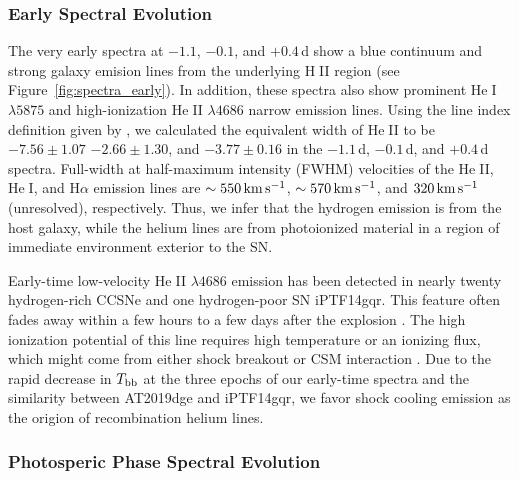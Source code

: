 \documentclass[twocolumn]{aastex63}
\def\ion#1#2{#1$\;${\footnotesize\rm{#2}}\relax}
\begin{document}
\begin{CJK*}{UTF8}{gbsn}
\subsubsection{Early Spectral Evolution} \label{subsubsec:spec_early}
The very early spectra at $-1.1$, $-0.1$, and $+0.4$\,d show a blue continuum and strong galaxy 
emision lines from the underlying \ion{H}{II} region (see Figure~\ref{fig:spectra_early}). In 
addition, these spectra also show prominent \ion{He}{I} $\lambda5875$ and high-ionization \ion{He}{II} 
$\lambda4686$ narrow emission lines. Using the line index definition given by \citet{Khazov2016}, we 
calculated the equivalent width of \ion{He}{II} to be $-7.56\pm 1.07$ 
$-2.66\pm 1.30$, and $-3.77\pm 0.16$ in the $-1.1$\,d, $-0.1$\,d, and $+0.4$\,d spectra. Full-width at 
half-maximum intensity (FWHM) velocities of the \ion{He}{II}, \ion{He}{I}, and H$\alpha$ emission lines 
are $\sim 550\,{\rm km\,s^{-1}}$, $\sim 570\,{\rm km\,s^{-1}}$, and $320\,{\rm km\,s^{-1}}$ (unresolved), 
respectively. Thus, we infer that the hydrogen emission is from the host galaxy, while the helium lines 
are from photoionized material in a region of immediate environment exterior to the SN.

Early-time low-velocity \ion{He}{II} $\lambda4686$ emission has been detected in nearly twenty
hydrogen-rich CCSNe and one hydrogen-poor SN iPTF14gqr. This feature often fades away within a 
few hours to a few days after the explosion \citep{Yaron2017}. The high ionization potential of this line 
requires high temperature or an ionizing flux, which might come from either shock breakout or CSM 
interaction \citep{GalYam2014, Smith2015}. Due to the rapid decrease in $T_{\rm bb}$ at the three 
epochs of our early-time spectra and the similarity between AT2019dge and iPTF14gqr, we favor shock 
cooling emission as the origion of recombination helium lines.

\subsubsection{Photosperic Phase Spectral Evolution}


\end{CJK*}
\end{document}
